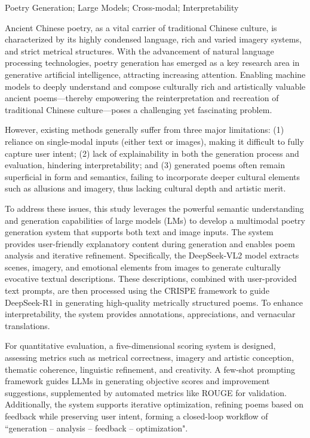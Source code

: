 \begin{enabstract}{Poetry Generation; Large Models; Cross-modal; Interpretability}


Ancient Chinese poetry, as a vital carrier of traditional Chinese culture, is characterized by its highly condensed language, rich and varied imagery systems, and strict metrical structures. With the advancement of natural language processing technologies, poetry generation has emerged as a key research area in generative artificial intelligence, attracting increasing attention. Enabling machine models to deeply understand and compose culturally rich and artistically valuable ancient poems—thereby empowering the reinterpretation and recreation of traditional Chinese culture—poses a challenging yet fascinating problem.  

However, existing methods generally suffer from three major limitations: (1) reliance on single-modal inputs (either text or images), making it difficult to fully capture user intent; (2) lack of explainability in both the generation process and evaluation, hindering interpretability; and (3) generated poems often remain superficial in form and semantics, failing to incorporate deeper cultural elements such as allusions and imagery, thus lacking cultural depth and artistic merit.  

To address these issues, this study leverages the powerful semantic understanding and generation capabilities of large models (LMs) to develop a multimodal poetry generation system that supports both text and image inputs. The system provides user-friendly explanatory content during generation and enables poem analysis and iterative refinement. Specifically, the DeepSeek-VL2 model extracts scenes, imagery, and emotional elements from images to generate culturally evocative textual descriptions. These descriptions, combined with user-provided text prompts, are then processed using the CRISPE framework to guide DeepSeek-R1 in generating high-quality metrically structured poems. To enhance interpretability, the system provides annotations, appreciations, and vernacular translations.  
  
For quantitative evaluation, a five-dimensional scoring system is designed, assessing metrics such as metrical correctness, imagery and artistic conception, thematic coherence, linguistic refinement, and creativity. A few-shot prompting framework guides LLMs in generating objective scores and improvement suggestions, supplemented by automated metrics like ROUGE for validation. Additionally, the system supports iterative optimization, refining poems based on feedback while preserving user intent, forming a closed-loop workflow of ``generation -- analysis -- feedback -- optimization".


\end{enabstract}
